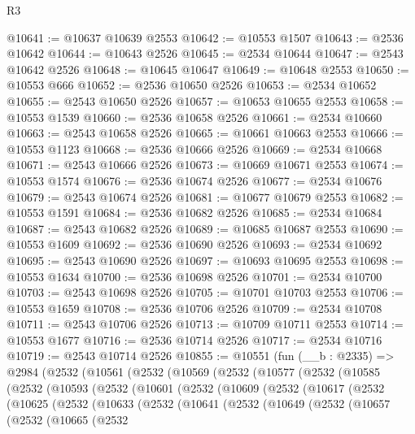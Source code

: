 \begin{lexlean}{R3}
\begin{coremodule}
@10641 := @10637 @10639 @2553
@10642 := @10553 @1507
@10643 := @2536 @10642
@10644 := @10643 @2526
@10645 := @2534 @10644
@10647 := @2543 @10642 @2526
@10648 := @10645 @10647
@10649 := @10648 @2553
@10650 := @10553 @666
@10652 := @2536 @10650 @2526
@10653 := @2534 @10652
@10655 := @2543 @10650 @2526
@10657 := @10653 @10655 @2553
@10658 := @10553 @1539
@10660 := @2536 @10658 @2526
@10661 := @2534 @10660
@10663 := @2543 @10658 @2526
@10665 := @10661 @10663 @2553
@10666 := @10553 @1123
@10668 := @2536 @10666 @2526
@10669 := @2534 @10668
@10671 := @2543 @10666 @2526
@10673 := @10669 @10671 @2553
@10674 := @10553 @1574
@10676 := @2536 @10674 @2526
@10677 := @2534 @10676
@10679 := @2543 @10674 @2526
@10681 := @10677 @10679 @2553
@10682 := @10553 @1591
@10684 := @2536 @10682 @2526
@10685 := @2534 @10684
@10687 := @2543 @10682 @2526
@10689 := @10685 @10687 @2553
@10690 := @10553 @1609
@10692 := @2536 @10690 @2526
@10693 := @2534 @10692
@10695 := @2543 @10690 @2526
@10697 := @10693 @10695 @2553
@10698 := @10553 @1634
@10700 := @2536 @10698 @2526
@10701 := @2534 @10700
@10703 := @2543 @10698 @2526
@10705 := @10701 @10703 @2553
@10706 := @10553 @1659
@10708 := @2536 @10706 @2526
@10709 := @2534 @10708
@10711 := @2543 @10706 @2526
@10713 := @10709 @10711 @2553
@10714 := @10553 @1677
@10716 := @2536 @10714 @2526
@10717 := @2534 @10716
@10719 := @2543 @10714 @2526
@10855 := @10551
    (fun (__b : @2335) =>
    @2984
      (@2532
        (@10561
          (@2532
            (@10569
              (@2532
                (@10577
                  (@2532
                    (@10585
                      (@2532
                        (@10593
                          (@2532
                            (@10601
                              (@2532
                                (@10609
                                  (@2532
                                    (@10617
                                      (@2532
                                        (@10625
                                          (@2532
                                            (@10633
                                              (@2532
                                                (@10641
                                                  (@2532
                                                    (@10649
                                                      (@2532
                                                        (@10657
                                                          (@2532
                                                            (@10665
                                                              (@2532

\end{coremodule}
\end{lexlean}
